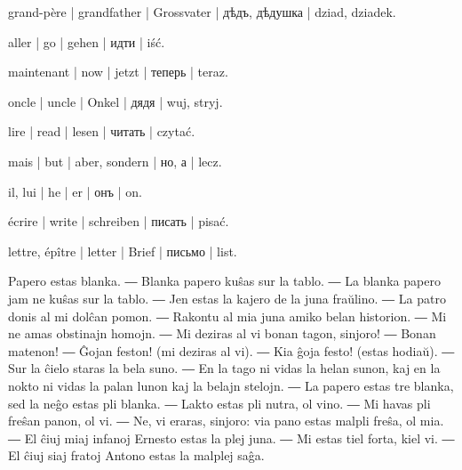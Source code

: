 \begin{ekzvocab}{1em}
 grand-père | grandfather | Grossvater | дѣдъ, дѣдушка | dziad, dziadek.

 aller | go | gehen | идти | iść.

 maintenant | now | jetzt | теперь | teraz.

 oncle | uncle | Onkel | дядя | wuj, stryj.

 lire | read | lesen | читать | czytać.

 mais | but | aber, sondern | но, а | lecz.

 il, lui | he | er | онъ | on.

 écrire | write | schreiben | писать | pisać.

 lettre, épître | letter | Brief | письмо | list.

\end{ekzvocab}



Papero estas blanka. ― Blanka papero kuŝas sur la tablo. ― La blanka papero jam ne kuŝas sur la tablo. ― Jen estas la kajero de la juna fraŭlino. ― La patro donis al mi dolĉan pomon. ― Rakontu al mia juna amiko belan historion. ― Mi ne amas obstinajn homojn. ― Mi deziras al vi bonan tagon, sinjoro! ― Bonan matenon! ― Ĝojan feston! (mi deziras al vi). ― Kia ĝoja festo! (estas hodiaŭ). ― Sur la ĉielo staras la bela suno. ― En la tago ni vidas la helan sunon, kaj en la nokto ni vidas la palan lunon kaj la belajn stelojn. ― La papero estas tre blanka, sed la neĝo estas pli blanka. ― Lakto estas pli nutra, ol vino. ― Mi havas pli freŝan panon, ol vi. ― Ne, vi eraras, sinjoro: via pano estas malpli freŝa, ol mia. ― El ĉiuj miaj infanoj Ernesto estas la plej juna. ― Mi estas tiel forta, kiel vi. ― El ĉiuj siaj fratoj Antono estas la malplej saĝa.


